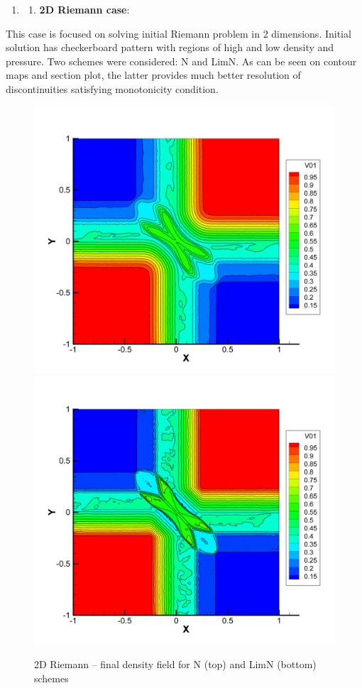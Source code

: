 \documentclass[plainboxedsections, 17pt, b1]{sciposter}
\begin{document}
\begin{multicols}{3}
\begin{enumerate}\addtocounter{enumi}{1}
	\item \begin{enumerate}
		\item \textbf{2D Riemann case}:
	\end{enumerate}
\end{enumerate}
This case is focused on solving initial Riemann problem in 2 dimensions. Initial solution has checkerboard pattern with regions of high and low density and pressure. Two schemes were considered: N and LimN. As can be seen on contour maps and section plot, the latter provides much better resolution of discontinuities satisfying monotonicity condition.

\begin{figure}%
	\centering
	\includegraphics[width=0.6\columnwidth]{img/riemann2d_n.png}
	\includegraphics[width=0.6\columnwidth]{img/riemann2d_limn.png} \\
	\caption{2D Riemann -- final density field for N (top) and LimN (bottom) schemes}%
\end{figure}


\end{multicols}
\end{document}
